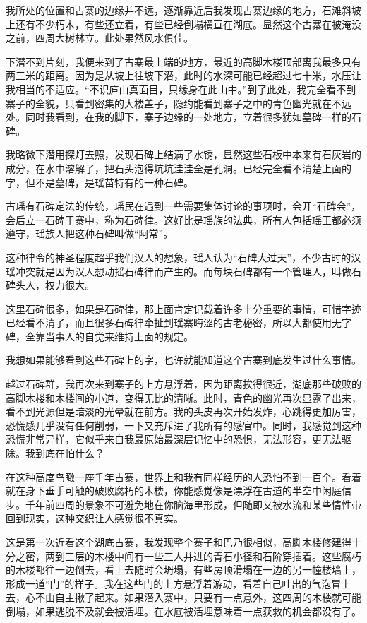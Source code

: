 我所处的位置和古寨的边缘并不远，逐渐靠近后我发现古寨边缘的地方，石滩斜坡上还有不少朽木，有些还立着，有些已经倒塌横亘在湖底。显然这个古寨在被淹没之前，四周大树林立。此处果然风水俱佳。

下潜不到片刻，我便来到了古寨最上端的地方，最近的高脚木楼顶部离我最多只有两三米的距离。因为是从坡上往坡下潜，此时的水深可能已经超过七十米，水压让我相当的不适应。“不识庐山真面目，只缘身在此山中。”到了此处，我完全看不到寨子的全貌，只看到密集的大楼盖子，隐约能看到寨子之中的青色幽光就在不远处。同时我看到，在我的脚下，寨子边缘的一处地方，立着很多犹如墓碑一样的石碑。

我略微下潜用探灯去照，发现石碑上结满了水锈，显然这些石板中本来有石灰岩的成分，在水中溶解了，把石头泡得坑坑洼洼全是孔洞。已经完全看不清楚上面的字，但不是墓碑，是瑶苗特有的一种石碑。

古瑶有石碑定法的传统，瑶民在遇到一些需要集体讨论的事项时，会开“石碑会”，会后立一石碑于寨中，称为石碑律。这好比是瑶族的法典，所有人包括瑶王都必须遵守，瑶族人把这种石碑叫做“阿常”。

这种律令的神圣程度超乎我们汉人的想象，瑶人认为“石碑大过天”，不少古时的汉瑶冲突就是因为汉人想动摇石碑律而产生的。而每块石碑都有一个管理人，叫做石碑头人，权力很大。

这里石碑很多，如果是石碑律，那上面肯定记载着许多十分重要的事情，可惜字迹已经看不清了，而且很多石碑律牵扯到瑶寨晦涩的古老秘密，所以大都使用无字碑，全靠当事人的自觉来维持上面的规定。

我想如果能够看到这些石碑上的字，也许就能知道这个古寨到底发生过什么事情。

越过石碑群，我再次来到寨子的上方悬浮着，因为距离挨得很近，湖底那些破败的高脚木楼和木楼间的小道，变得无比的清晰。此时，青色的幽光再次显露了出来，看不到光源但是暗淡的光晕就在前方。我的头皮再次开始发炸，心跳得更加厉害，恐慌感几乎没有任何削弱，一下又充斥进了我所有的感官中。同时，我感觉到这种恐慌非常异样，它似乎来自我最原始最深层记忆中的恐惧，无法形容，更无法驱除。我到底在怕什么？

在这种高度鸟瞰一座千年古寨，世界上和我有同样经历的人恐怕不到一百个。看着就在身下垂手可触的破败腐朽的木楼，你能感觉像是漂浮在古道的半空中闲庭信步。千年前四周的景象不可避免地在你脑海里形成，但随即又被水流和某些情性带回到现实，这种交织让人感觉很不真实。

这是第一次近看这个湖底古寨，我发现整个寨子和巴乃很相似，高脚木楼修建得十分之密，两到三层的木楼中间有一些三人并进的青石小径和石阶穿插着。这些腐朽的木楼都往一边倒去，看上去随时会坍塌，有些房顶滑塌在一边的另一幢楼墙上，形成一道“门”的样子。我在这些门的上方悬浮着游动，看着自己吐出的气泡冒上去，心不由自主揪了起来。如果潜入寨中，只要有一点意外，这四周的木楼就可能倒塌，如果逃脱不及就会被活埋。在水底被活埋意味着一点获救的机会都没有了。

